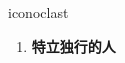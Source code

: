 
\begin{frame}
{\huge iconoclast}
\begin{center}
\begin{enumerate}\Large
  \item \textbf{特立独行的人}
\end{enumerate}
\end{center}
\end{frame}
